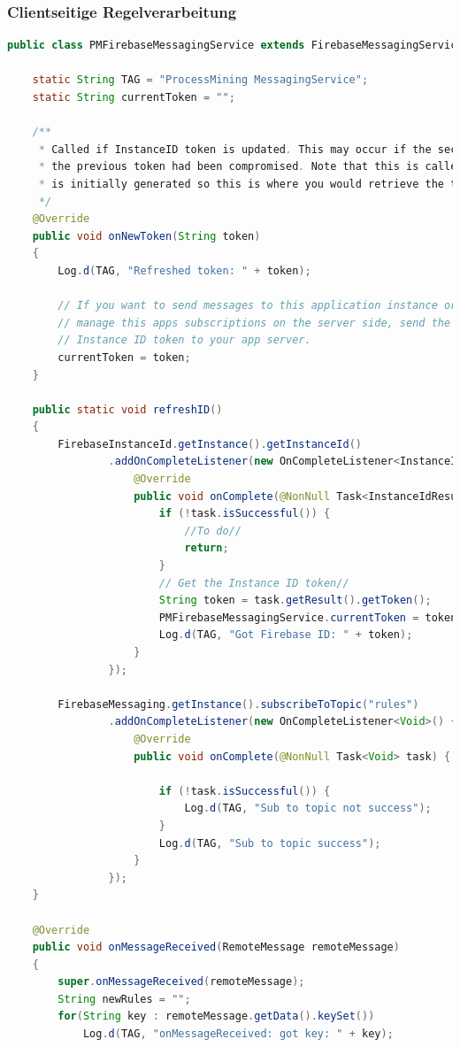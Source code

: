 \subsubsection{Clientseitige Regelverarbeitung}\small
\begin{lstlisting}[language=Java]
public class PMFirebaseMessagingService extends FirebaseMessagingService {

    static String TAG = "ProcessMining MessagingService";
    static String currentToken = "";

    /**
     * Called if InstanceID token is updated. This may occur if the security of
     * the previous token had been compromised. Note that this is called when the InstanceID token
     * is initially generated so this is where you would retrieve the token.
     */
    @Override
    public void onNewToken(String token)
    {
        Log.d(TAG, "Refreshed token: " + token);

        // If you want to send messages to this application instance or
        // manage this apps subscriptions on the server side, send the
        // Instance ID token to your app server.
        currentToken = token;
    }

    public static void refreshID()
    {
        FirebaseInstanceId.getInstance().getInstanceId()
                .addOnCompleteListener(new OnCompleteListener<InstanceIdResult>() {
                    @Override
                    public void onComplete(@NonNull Task<InstanceIdResult> task) {
                        if (!task.isSuccessful()) {
                            //To do//
                            return;
                        }
                        // Get the Instance ID token//
                        String token = task.getResult().getToken();
                        PMFirebaseMessagingService.currentToken = token;
                        Log.d(TAG, "Got Firebase ID: " + token);
                    }
                });

        FirebaseMessaging.getInstance().subscribeToTopic("rules")
                .addOnCompleteListener(new OnCompleteListener<Void>() {
                    @Override
                    public void onComplete(@NonNull Task<Void> task) {

                        if (!task.isSuccessful()) {
                            Log.d(TAG, "Sub to topic not success");
                        }
                        Log.d(TAG, "Sub to topic success");
                    }
                });
    }

    @Override
    public void onMessageReceived(RemoteMessage remoteMessage)
    {
        super.onMessageReceived(remoteMessage);
        String newRules = "";
        for(String key : remoteMessage.getData().keySet())
            Log.d(TAG, "onMessageReceived: got key: " + key);


\end{lstlisting}

